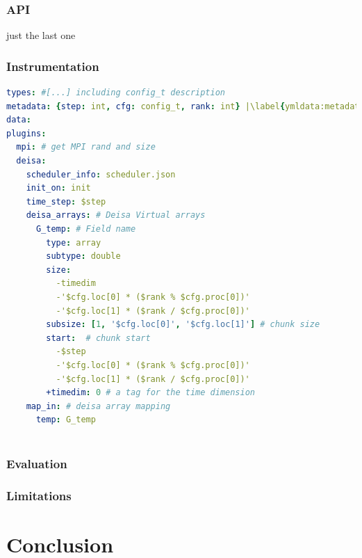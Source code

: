 \subsubsection{API}
just the last one 
\subsubsection{Instrumentation}
\begin{lstlisting}[float, label=ymldata, language=yaml, caption=Data description in \pdi \deisa YAML file]
types: #[...] including config_t description
metadata: {step: int, cfg: config_t, rank: int} |\label{ymldata:metadata}|
data: 
plugins:
  mpi: # get MPI rand and size
  deisa:
    scheduler_info: scheduler.json
    init_on: init 
    time_step: $step 
    deisa_arrays: # Deisa Virtual arrays
      G_temp: # Field name
        type: array
        subtype: double
        size:
          -timedim 
          -'$cfg.loc[0] * ($rank % $cfg.proc[0])'
          -'$cfg.loc[1] * ($rank / $cfg.proc[0])'
        subsize: [1, '$cfg.loc[0]', '$cfg.loc[1]'] # chunk size
        start:  # chunk start
          -$step
          -'$cfg.loc[0] * ($rank % $cfg.proc[0])'
          -'$cfg.loc[1] * ($rank / $cfg.proc[0])'
        +timedim: 0 # a tag for the time dimension
    map_in: # deisa array mapping
      temp: G_temp
        
\end{lstlisting}
\subsubsection{Evaluation}
\subsubsection{Limitations}

\section{Conclusion}